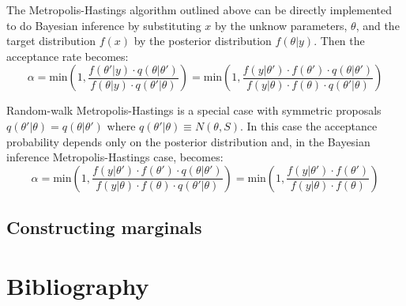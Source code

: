 \documentclass[11pt,fleqn]{book} %
\begin{document}
The Metropolis-Hastings algorithm outlined above can be directly implemented to do
Bayesian inference by substituting $x$ by the unknow parameters, $\theta$, and 
the target distribution $f(x)$ by the posterior distribution $f(\theta|y)$. Then 
the acceptance rate becomes:
\begin{displaymath}
\alpha = \textrm{min}\left(1,\frac{f(\theta'|y) \cdot q(\theta|\theta')}{f(\theta|y) \cdot q(\theta'|\theta)}\right) = \textrm{min}\left(1,\frac{f(y|\theta') \cdot f(\theta') \cdot q(\theta|\theta')}{f(y|\theta)  \cdot f(\theta) \cdot q(\theta'|\theta)}\right)
\end{displaymath}

Random-walk Metropolis-Hastings is a special case with symmetric proposals
$q(\theta'|\theta) = q(\theta|\theta')$ where $q(\theta'|\theta) \equiv N(\theta,S)$. 
In this case the acceptance probability depends only on the posterior distribution
and, in the Bayesian inference Metropolis-Hastings case, becomes:
\begin{displaymath}
\alpha = 
\textrm{min}\left(1,\frac{f(y|\theta') \cdot f(\theta') \cdot q(\theta|\theta')}{f(y|\theta)  \cdot f(\theta) \cdot q(\theta'|\theta)}\right) = 
\textrm{min}\left(1,\frac{f(y|\theta') \cdot f(\theta')}{f(y|\theta)  \cdot f(\theta)}\right)
\end{displaymath}

\begin{comment}
  A continuación se adapta el algoritmo descrito. Como proposal distribution q se usa q(θ’|θ)=N(θ,σ) que tiene la propiedad que q(θ’|θ)= q(θ|θ’) y simplifica la expresión α. También se modifica para operar con parámetros de dimensión d.
\end{comment}

\section{Constructing marginals}

\begin{comment}
\end{comment}

\chapter*{Bibliography}
\end{document}
